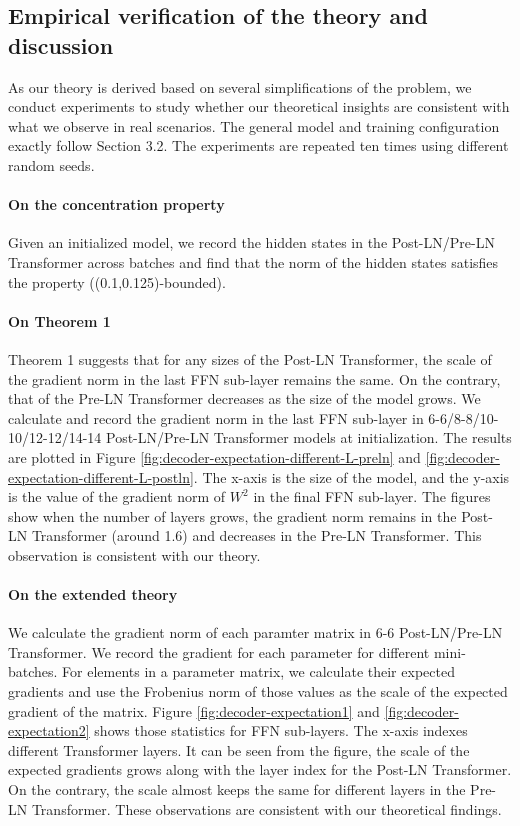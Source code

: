 \documentclass{article}
\begin{document}
\subsection{Empirical verification of the theory and discussion}
As our theory is derived based on several simplifications of the problem, we conduct experiments to study whether our theoretical insights are consistent with what we observe in real scenarios. The general model and training configuration exactly follow Section 3.2. The experiments are repeated ten times using different random seeds. 

\paragraph{On the concentration property} Given an initialized model, we record the hidden states in the Post-LN/Pre-LN Transformer across batches and find that the norm of the hidden states satisfies the property ((0.1,0.125)-bounded).

\paragraph{On Theorem 1} Theorem 1 suggests that for any sizes of the Post-LN Transformer, the scale of the gradient norm in the last FFN sub-layer remains the same. On the contrary, that of the Pre-LN Transformer decreases as the size of the model grows. We calculate and record the gradient norm in the last FFN sub-layer in 6-6/8-8/10-10/12-12/14-14 Post-LN/Pre-LN Transformer models at initialization. The results are plotted in Figure \ref{fig:decoder-expectation-different-L-preln} and \ref{fig:decoder-expectation-different-L-postln}. The x-axis is the size of the model, and the y-axis is the value of the gradient norm of $W^2$ in the final FFN sub-layer. The figures show when the number of layers grows, the gradient norm remains in the Post-LN Transformer (around 1.6) and decreases in the Pre-LN Transformer. This observation is consistent with our theory.

\paragraph{On the extended theory} %
We calculate the gradient norm of each paramter matrix in 6-6 Post-LN/Pre-LN Transformer. We record the gradient for each parameter for different mini-batches. For elements in a parameter matrix, we calculate their expected gradients and use the Frobenius norm of those values as the scale of the expected gradient of the matrix.  Figure \ref{fig:decoder-expectation1} and \ref{fig:decoder-expectation2} shows those statistics for FFN sub-layers. The x-axis indexes different Transformer layers. It can be seen from the figure, the scale of the expected gradients grows along with the layer index for the Post-LN Transformer. On the contrary, the scale almost keeps the same for different layers in the Pre-LN Transformer. These observations are consistent with our theoretical findings.  
\end{document}
